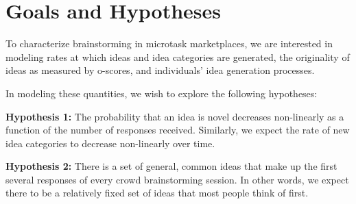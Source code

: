 \section{Goals and Hypotheses}



To characterize brainstorming in microtask marketplaces, we are interested in modeling rates at which ideas and idea categories are generated, the originality of ideas as measured by o-scores, and individuals' idea generation processes.



In modeling these quantities, we wish to explore the following hypotheses:

\textbf{Hypothesis 1:} The probability that an idea is novel decreases non-linearly as a function of the number of responses received. Similarly, we expect the rate of new idea categories to decrease non-linearly over time.

\textbf{Hypothesis 2:} There is a set of general, common ideas that make up the first several responses of every crowd brainstorming session. In other words, we expect there to be a relatively fixed set of ideas that most people think of first.


